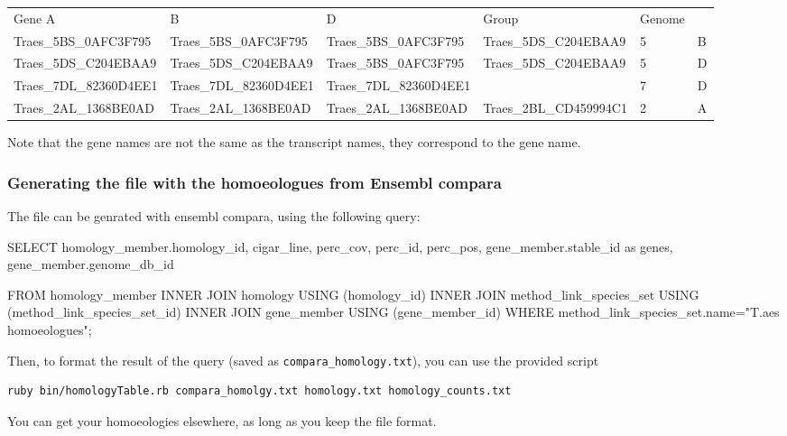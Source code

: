 \begin{tiny}
\begin{tabular}{llllll}
Gene A & B & D & Group & Genome \\
Traes\_5BS\_0AFC3F795 & Traes\_5BS\_0AFC3F795 & Traes\_5BS\_0AFC3F795 & Traes\_5DS\_C204EBAA9 & 5 & B \\
 Traes\_5DS\_C204EBAA9 & Traes\_5DS\_C204EBAA9 & Traes\_5BS\_0AFC3F795 & Traes\_5DS\_C204EBAA9& 5 & D \\
Traes\_7DL\_82360D4EE1 & Traes\_7DL\_82360D4EE1&Traes\_7DL\_82360D4EE1 & & 7 & D \\
Traes\_2AL\_1368BE0AD &  Traes\_2AL\_1368BE0AD & Traes\_2AL\_1368BE0AD & Traes\_2BL\_CD459994C1 & 2 & A \\ 
\end{tabular}
\end{tiny}

Note that the gene names are not the same as the transcript names, they
correspond to the gene name.

\subsubsection{Generating the file with the homoeologues from Ensembl
compara}\label{generating-the-file-with-the-homoeologues-from-ensembl-compara}

The file can be genrated with ensembl compara, using the following
query:

\begin{code}[language=SQL]
SELECT 
    homology_member.homology_id, cigar_line, perc_cov, perc_id, perc_pos, 
    gene_member.stable_id as genes, 
    gene_member.genome_db_id

FROM 
    homology_member 
INNER JOIN homology USING (homology_id) 
INNER JOIN method_link_species_set USING (method_link_species_set_id) 
INNER JOIN gene_member USING (gene_member_id)
WHERE method_link_species_set.name="T.aes homoeologues";
\end{code}

Then, to format the result of the query (saved as
\lstinline!compara_homology.txt!), you can use the provided script

\begin{lstlisting}[language=sh]
ruby bin/homologyTable.rb compara_homolgy.txt homology.txt homology_counts.txt
\end{lstlisting}

You can get your homoeologies elsewhere, as long as you keep the file
format.

